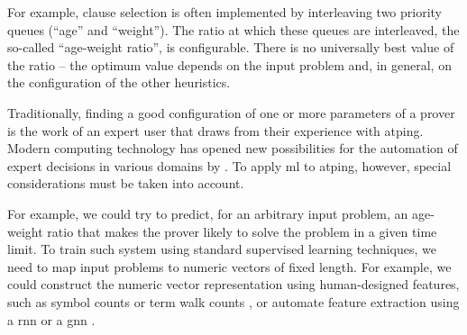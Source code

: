 For example, clause selection is often implemented by interleaving two priority queues (\enquote{age} and \enquote{weight}).
The ratio at which these queues are interleaved, the so-called \enquote{age-weight ratio}, is configurable.
There is no universally best value of the ratio --
the optimum value depends on the input problem
\cite{DBLP:conf/cade/SchulzM16}
and, in general, on the configuration of the other heuristics.

Traditionally, finding a good configuration of one or more parameters of a prover is the work of an expert user that draws from their experience with \gls{atping}.
Modern computing technology has opened new possibilities for the automation of expert decisions in various domains by  \cite{DBLP:books/lib/HastieTF09,DBLP:journals/nn/Schmidhuber15}.
To apply \gls{ml} to \gls{atping}, however, special considerations must be taken into account.


For example, we could try to predict, for an arbitrary input problem, an age-weight ratio
that makes the prover likely to solve the problem in a given time limit.
To train such system using standard supervised learning techniques,
we need to map input problems to numeric vectors of fixed length.
For example, we could construct the numeric vector representation using human-designed features,
such as symbol counts or term walk counts \cite{DBLP:conf/mkm/JakubuvU17},
or automate feature extraction using a \gls{rnn} \cite{DBLP:conf/cade/ChvalovskyJ0U19,DBLP:conf/iclr/EvansSAKG18} or a \gls{gnn} \cite{DBLP:conf/cade/JakubuvCOP0U20}.

